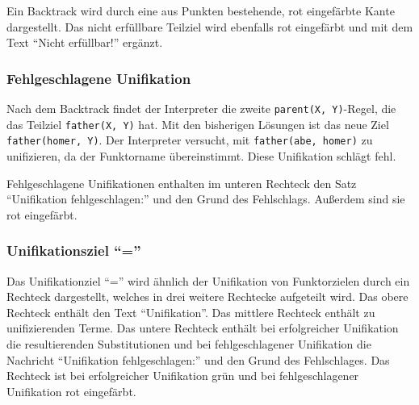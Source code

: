 \documentclass[parskip=full,11pt,twoside]{scrartcl}
\begin{document}
\begin{minipage}{\linewidth}
\end{minipage}

Ein Backtrack wird durch eine aus Punkten bestehende, rot eingefärbte Kante dargestellt.
Das nicht erfüllbare Teilziel wird ebenfalls rot eingefärbt und mit dem Text \enquote{Nicht erfüllbar!} ergänzt.

\subsubsection{Fehlgeschlagene Unifikation}

Nach dem Backtrack findet der Interpreter die zweite \texttt{parent(X, Y)}-Regel, die das Teilziel \texttt{father(X, Y)} hat.
Mit den bisherigen Lösungen ist das neue Ziel \texttt{father(homer, Y)}.
Der Interpreter versucht, mit \texttt{father(abe, homer)} zu unifizieren, da der Funktorname übereinstimmt.
Diese Unifikation schlägt fehl.

\begin{minipage}{\linewidth}
\end{minipage}

Fehlgeschlagene Unifikationen enthalten im unteren Rechteck den Satz \enquote{Unifikation fehlgeschlagen:} und den Grund des Fehlschlags.
Außerdem sind sie rot eingefärbt.

\subsubsection{Unifikationsziel \enquote{=}}

Das Unifikationziel \enquote{=} wird ähnlich der Unifikation von Funktorzielen durch ein Rechteck dargestellt, welches in drei weitere Rechtecke aufgeteilt wird.
Das obere Rechteck enthält den Text \enquote{Unifikation}.
Das mittlere Rechteck enthält zu unifizierenden Terme.
Das untere Rechteck enthält bei erfolgreicher Unifikation die resultierenden Substitutionen und bei fehlgeschlagener Unifikation die Nachricht \enquote{Unifikation fehlgeschlagen:} und den Grund des Fehlschlages.
Das Rechteck ist bei erfolgreicher Unifikation grün und bei fehlgeschlagener Unifikation rot eingefärbt.
\end{document}
